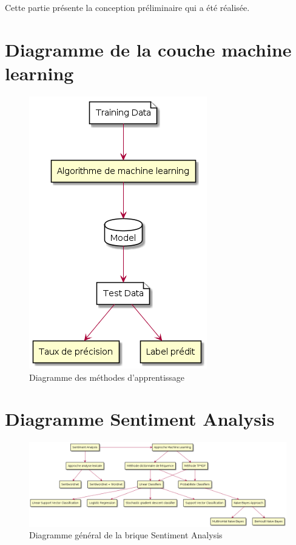 \par Cette partie présente la conception préliminaire qui a été réalisée.





\section {Diagramme de la couche machine learning}
\begin{figure}[h!]
	\centerline{\includegraphics[scale=0.8]{img/diagML.png}}
	\caption{Diagramme des méthodes d'apprentissage}
\end{figure}


\section {Diagramme Sentiment Analysis}

\begin{figure}[h!]
	\centerline{\includegraphics[scale=0.4]{img/DiagSentimentAnalysis.png}}
	\caption{Diagramme général de la brique Sentiment Analysis}
\end{figure}



